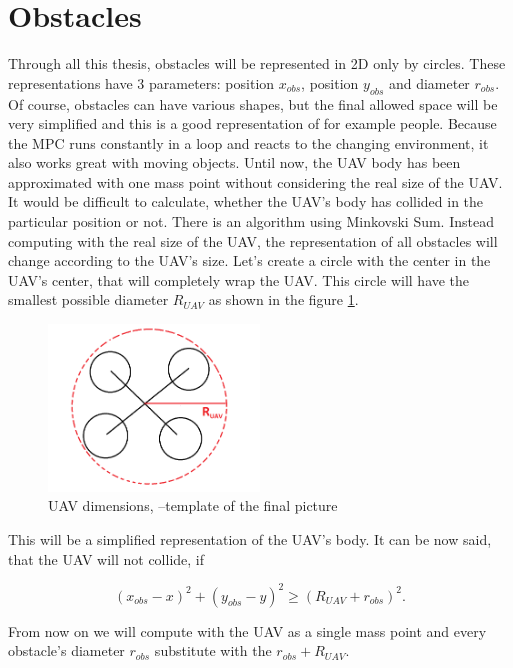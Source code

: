\documentclass{article}
\begin{document}
\section{Obstacles}
Through all this thesis, obstacles will be represented in 2D only by circles. These representations have 3 parameters: position $x_{obs}$, position $y_{obs}$ and diameter $r_{obs}$. Of course, obstacles can have various shapes, but the final allowed space will be very simplified and this is a good representation of for example people. Because the MPC runs constantly in a loop and reacts to the changing environment, it also works great with moving objects. Until now, the UAV body has been approximated with one mass point without considering the real size of the UAV. It would be difficult to calculate, whether the UAV's body has collided in the particular position or not. There is an algorithm using Minkovski Sum. Instead computing with the real size of the UAV, the representation of all obstacles will change according to the UAV's size.
Let's create a circle with the center in the UAV's center, that will completely wrap the UAV. This circle will have the smallest possible diameter $R_{UAV}$ as shown in the figure \ref{fig:UAV_dimensions}. 

\begin{figure}[h]
\begin{center}
\includegraphics[width=0.5\textwidth]{fig/UAV_dimensions} 
\caption{UAV dimensions, --template of the final picture}
\label{fig:UAV_dimensions}
\end{center}
\end{figure}

This will be a simplified representation of the UAV's body. It can be now said, that the UAV will not collide, if 

\begin{equation}
(x_{obs} - x)^2 + (y_{obs} - y)^2 \geq (R_{UAV} + r_{obs})^2.
\end{equation}

From now on we will compute with the UAV as a single mass point and every obstacle's diameter $r_{obs}$ substitute with the $r_{obs} + R_{UAV}$.	
\end{document}
